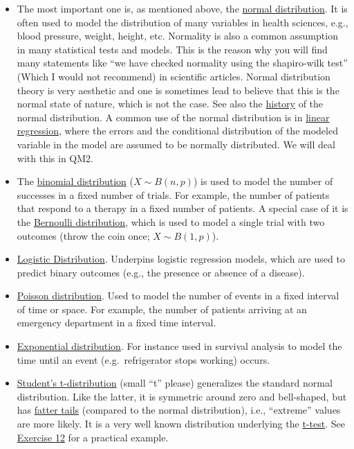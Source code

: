 \documentclass[
]{book}
\begin{document}
\begin{itemize}
\item
  The most important one is, as mentioned above, the \href{https://en.wikipedia.org/wiki/Normal_distribution}{normal distribution}.
  It is often used to model the distribution of many variables in health sciences, e.g., blood pressure, weight, height, etc.
  Normality is also a common assumption in many statistical tests and models. This is the reason why you will find many statements like
  ``we have checked normality using the shapiro-wilk test'' (Which I would not recommend) in scientific articles.
  Normal distribution theory is very aesthetic and one is sometimes lead to believe that this is the normal state of nature, which is
  not the case. See also the \href{https://en.wikipedia.org/wiki/Normal_distribution\#History}{history} of the normal distribution.
  A common use of the normal distribution is in \href{https://en.wikipedia.org/wiki/Linear_regression}{linear regression},
  where the errors and the conditional distribution of the modeled variable in the model are assumed to be normally distributed.
  We will deal with this in QM2.
\item
  The \href{https://en.wikipedia.org/wiki/Binomial_distribution}{binomial distribution} (\(X \sim B(n, p)\)) is used to model the number of successes in a fixed number of trials.
  For example, the number of patients that respond to a therapy in a fixed number of patients.
  A special case of it is the \href{https://en.wikipedia.org/wiki/Bernoulli_distribution}{Bernoulli distribution},
  which is used to model a single trial with two outcomes (throw the coin once; \(X \sim B(1,p)\)).
\item
  \href{https://en.wikipedia.org/wiki/Logistic_distribution}{Logistic Distribution}. Underpins logistic regression models,
  which are used to predict binary outcomes (e.g., the presence or absence of a disease).
\item
  \href{https://en.wikipedia.org/wiki/Poisson_distribution}{Poisson distribution}. Used to model the number of events in a fixed interval of time or space.
  For example, the number of patients arriving at an emergency department in a fixed time interval.
\item
  \href{https://en.wikipedia.org/wiki/Exponential_distribution}{Exponential distribution}.
  For instance used in survival analysis to model the time until an event (e.g.~refrigerator stops working) occurs.
\item
  \href{https://en.wikipedia.org/wiki/Student\%27s_t-distribution}{Student's t-distribution} (small ``t'' please) generalizes
  the standard normal distribution. Like the latter, it is symmetric around zero and bell-shaped, but
  has \href{https://en.wikipedia.org/wiki/Fat-tailed_distribution}{fatter tails} (compared to the normal distribution), i.e.,
  ``extreme'' values are more likely. It is a very well known distribution underlying the \href{https://en.wikipedia.org/wiki/Student\%27s_t-test}{t-test}.
  See \hyperref[exercise12]{Exercise 12} for a practical example.
\end{itemize}
\end{document}
